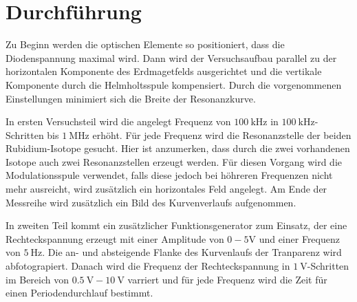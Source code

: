 \section{Durchführung}
\label{sec:Durchführung}

Zu Beginn werden die optischen Elemente so positioniert, dass die Diodenspannung maximal wird. Dann wird der Versuchsaufbau parallel zu der horizontalen Komponente des Erdmagetfelds ausgerichtet und die vertikale Komponente durch die Helmholtsspule kompensiert. Durch die vorgenommenen Einstellungen minimiert sich die Breite der Resonanzkurve. 

In ersten Versuchsteil wird die angelegt Frequenz von $\SI{100}{\kilo\hertz}$ in $\SI{100}{\kilo\hertz}$-Schritten bis $\SI{1}{\mega\hertz}$ erhöht. Für jede Frequenz wird die Resonanzstelle der beiden Rubidium-Isotope gesucht. Hier ist anzumerken, dass durch die zwei vorhandenen Isotope auch zwei Resonanzstellen erzeugt werden. Für diesen Vorgang wird die Modulationsspule verwendet, falls diese jedoch bei höhreren Frequenzen nicht mehr ausreicht, wird zusätzlich ein horizontales Feld angelegt. Am Ende der Messreihe wird zusätzlich ein Bild des Kurvenverlaufs aufgenommen.

In zweiten Teil kommt ein zusätzlicher Funktionsgenerator zum Einsatz, der eine Rechteckspannung erzeugt mit einer Amplitude von $0-5\si{\volt}$ und einer Frequenz von $\SI{5}{\hertz}$. Die an- und absteigende Flanke des Kurvenlaufs der Tranparenz wird abfotograpiert. Danach wird die Frequenz der Rechteckspannung in $\SI{1}{\volt}$-Schritten im Bereich von $\SI{0,5}{\volt}-\SI{10}{\volt}$ varriert und für jede Frequenz wird die Zeit für einen Periodendurchlauf bestimmt.